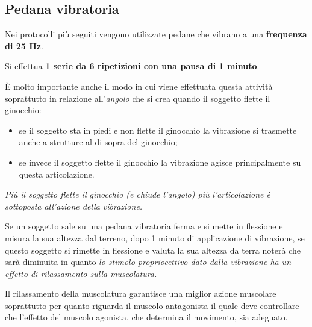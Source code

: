 \subsection{Pedana vibratoria}


Nei protocolli più seguiti vengono utilizzate pedane che vibrano a una
\textbf{frequenza di 25 Hz}.

Si effettua \textbf{1 serie da 6 ripetizioni con una pausa di 1 minuto}.

È molto importante anche il modo in cui viene effettuata questa attività
soprattutto in relazione all'\emph{angolo} che si crea quando il
soggetto flette il ginocchio:

\begin{itemize}
 
\item
  se il soggetto sta in piedi e non flette il ginocchio la vibrazione si
  trasmette anche a strutture al di sopra del ginocchio;
\item 
  se invece il soggetto flette il ginocchio la vibrazione agisce
  principalmente su questa articolazione.
\end{itemize}

\emph{Più il soggetto flette il ginocchio (e chiude l'angolo) più
l'articolazione è sottoposta all'azione della vibrazione. }

Se un soggetto sale su una pedana vibratoria ferma e si mette in
flessione e misura la sua altezza dal terreno, dopo 1 minuto di
applicazione di vibrazione, se questo soggetto si rimette in flessione e
valuta la sua altezza da terra noterà che sarà diminuita in quanto
\emph{lo stimolo propriocettivo dato dalla vibrazione ha un effetto di
rilassamento sulla muscolatura.}

Il rilassamento della muscolatura garantisce una miglior azione
muscolare soprattutto per quanto riguarda il muscolo antagonista il
quale deve controllare che l'effetto del muscolo agonista, che determina
il movimento, sia adeguato.

